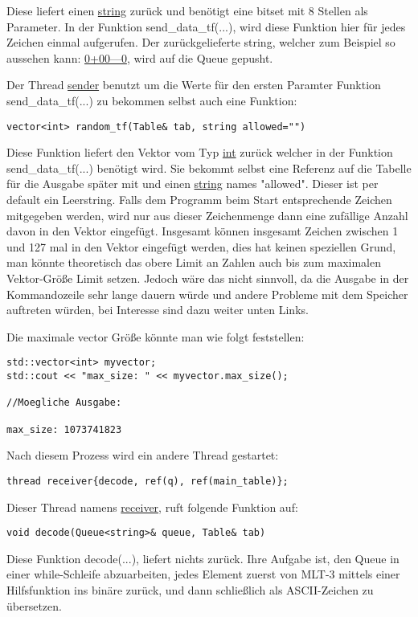 \documentclass{article}
\begin{document}
Diese liefert einen \underline{string} zurück und benötigt eine bitset mit 8 Stellen als Parameter. In der Funktion send\_data\_tf(...), wird diese Funktion hier für jedes Zeichen
einmal aufgerufen. Der zurückgelieferte string, welcher zum Beispiel so aussehen kann: \underline{0+00---0}, wird auf die Queue gepusht.

Der Thread \underline{sender} benutzt um die Werte für den ersten Paramter Funktion send\_data\_tf(...) zu bekommen selbst auch eine Funktion:
\begin{lstlisting}
vector<int> random_tf(Table& tab, string allowed="")
\end{lstlisting}

Diese Funktion liefert den Vektor vom Typ \underline{int} zurück welcher in der Funktion send\_data\_tf(...) benötigt wird. Sie bekommt selbst eine Referenz auf die
Tabelle für die Ausgabe später mit und einen \underline{string} names "allowed". Dieser ist per default ein Leerstring. Falls dem Programm beim Start entsprechende Zeichen mitgegeben
werden, wird nur aus dieser Zeichenmenge dann eine zufällige Anzahl davon in den Vektor eingefügt. Insgesamt können insgesamt Zeichen zwischen 1 und 127 mal in den Vektor eingefügt
werden, dies hat keinen speziellen Grund, man könnte theoretisch das obere Limit an Zahlen auch bis zum maximalen Vektor-Größe Limit setzen. Jedoch wäre das nicht sinnvoll, da die Ausgabe
in der Kommandozeile sehr lange dauern würde und andere Probleme mit dem Speicher auftreten würden, bei Interesse sind dazu weiter unten Links. 

Die maximale vector Größe könnte man
wie folgt feststellen:
\begin{lstlisting}
std::vector<int> myvector;
std::cout << "max_size: " << myvector.max_size();

//Moegliche Ausgabe:

max_size: 1073741823
\end{lstlisting}


Nach diesem Prozess wird ein andere Thread gestartet:
\begin{lstlisting}
thread receiver{decode, ref(q), ref(main_table)};
\end{lstlisting}

Dieser Thread namens \underline{receiver}, ruft folgende Funktion auf:
\begin{lstlisting}
void decode(Queue<string>& queue, Table& tab)
\end{lstlisting}
Diese Funktion decode(...), liefert nichts zurück. Ihre Aufgabe ist, den Queue in einer while-Schleife abzuarbeiten, jedes Element zuerst von MLT-3 mittels einer Hilfsfunktion 
ins binäre zurück, und dann schließlich als ASCII-Zeichen zu übersetzen.
\end{document}
